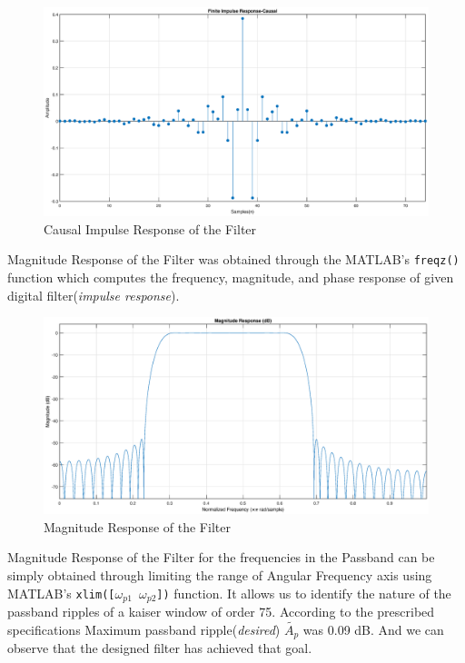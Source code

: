 \documentclass[a4paper,11pt]{article}%
\begin{document}
\begin{figure}[!h]
	\centering
	\includegraphics[scale=0.4]{figures/causal-impulse-response}
	\caption{Causal Impulse Response of the Filter}
\end{figure}
\vfill
Magnitude Response of the Filter was obtained through the MATLAB's {\tt freqz()} function which computes the frequency, magnitude, and phase response of given digital filter(\textit{impulse response}).
\begin{figure}[!h]
	\centering
	\includegraphics[scale=0.4]{figures/magnitude-response}
	\caption{Magnitude Response of the Filter}
\end{figure}

\pagebreak
Magnitude Response of the Filter for the frequencies in the Passband can be simply obtained through limiting the range of Angular Frequency axis using MATLAB's {\tt xlim([$\omega_{p1}$ $\omega_{p2}$])} function. It allows us to identify the nature of the passband  ripples of a kaiser window of order 75. According to the prescribed specifications Maximum passband ripple(\textit{desired})  $\tilde{A_p}$ was 0.09 dB. And we can observe that the designed filter has achieved that goal.
\end{document}
